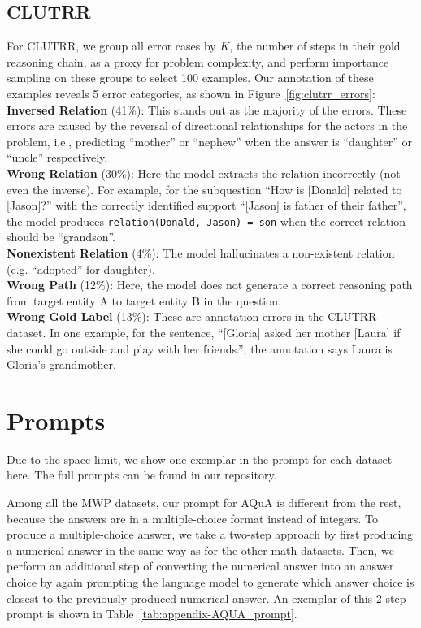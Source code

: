 \documentclass[11pt]{article}
\begin{document}
\subsection{CLUTRR}
\label{sec:appendix_clutrr_error_analysis}



For CLUTRR, we group all error cases by $K$, the number of steps in their gold reasoning chain, as a proxy for problem complexity, and perform importance sampling on these groups to select 100 examples. Our annotation of these examples reveals 5 error categories, as shown in Figure~\ref{fig:clutrr_errors}:\\
\textbf{Inversed Relation} (41\%): This stands out as the majority of the errors. These errors are caused by the reversal of directional relationships for the actors in the problem, i.e., predicting ``mother'' or ``nephew'' when the answer is ``daughter'' or ``uncle'' respectively.\\
\textbf{Wrong Relation} (30\%): Here the model extracts the relation incorrectly (not even the inverse). For example, for the subquestion ``How is [Donald] related to [Jason]?'' with the correctly identified support ``[Jason] is father of their father'', the model produces \texttt{relation(Donald, Jason) = son} when the correct relation should be ``grandson''.\\
\textbf{Nonexistent Relation} (4\%): The model hallucinates a non-existent relation (e.g. ``adopted'' for daughter). \\
\textbf{Wrong Path} (12\%): Here, the model does not generate a correct reasoning path from target entity A to target entity B in the question.\\
\textbf{Wrong Gold Label} (13\%): These are annotation errors in the CLUTRR dataset. In one example, for the sentence, ``[Gloria] asked her mother [Laura] if she could go outside and play with her friends.'', the annotation says Laura is Gloria's grandmother.




\section{Prompts}
\label{sec:appendix_prompt}

Due to the space limit, we show one exemplar in the prompt for each dataset here. The full prompts can be found in our repository.

Among all the MWP datasets, our prompt for AQuA is different from the rest, because the answers are in a multiple-choice format instead of integers. To produce a multiple-choice answer, we take a two-step approach by first producing a numerical answer in the same way as for the other math datasets. Then, we perform an additional step of converting the numerical answer into an answer choice by again prompting the language model to generate which answer choice is closest to the previously produced numerical answer. An exemplar of this 2-step prompt is shown in Table~\ref{tab:appendix-AQUA_prompt}.








\end{document}
